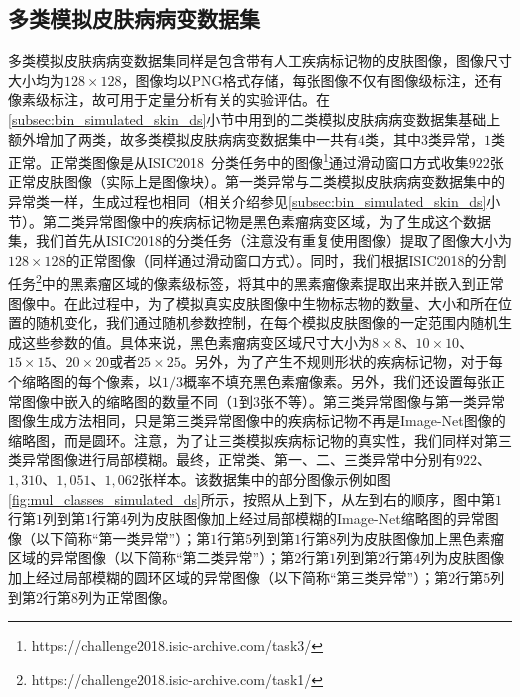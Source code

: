\subsection{多类模拟皮肤病病变数据集}
多类模拟皮肤病病变数据集同样是包含带有人工疾病标记物的皮肤图像，图像尺寸大小均为$128\times 128$，图像均以PNG格式存储，每张图像不仅有图像级标注，还有像素级标注，故可用于定量分析有关的实验评估。在\ref{subsec:bin_simulated_skin_ds}小节中用到的二类模拟皮肤病病变数据集基础上额外增加了两类，故多类模拟皮肤病病变数据集中一共有$4$类，其中$3$类异常，$1$类正常。正常类图像是从ISIC2018~\cite{codella2019skin, tschandl2018ham10000}分类任务中的图像\footnote{https://challenge2018.isic-archive.com/task3/}通过滑动窗口方式收集$922$张正常皮肤图像（实际上是图像块）。第一类异常与二类模拟皮肤病病变数据集中的异常类一样，生成过程也相同（相关介绍参见\ref{subsec:bin_simulated_skin_ds}小节）。第二类异常图像中的疾病标记物是黑色素瘤病变区域，为了生成这个数据集，我们首先从ISIC2018的分类任务（注意没有重复使用图像）提取了图像大小为$128\times 128$的正常图像（同样通过滑动窗口方式）。同时，我们根据ISIC2018的分割任务\footnote{https://challenge2018.isic-archive.com/task1/}中的黑素瘤区域的像素级标签，将其中的黑素瘤像素提取出来并嵌入到正常图像中。在此过程中，为了模拟真实皮肤图像中生物标志物的数量、大小和所在位置的随机变化，我们通过随机参数控制，在每个模拟皮肤图像的一定范围内随机生成这些参数的值。具体来说，黑色素瘤病变区域尺寸大小为$8\times 8$、$10\times 10$、$15\times 15$、$20\times 20$或者$25\times 25$。另外，为了产生不规则形状的疾病标记物，对于每个缩略图的每个像素，以$1/3$概率不填充黑色素瘤像素。另外，我们还设置每张正常图像中嵌入的缩略图的数量不同（$1$到$3$张不等）。第三类异常图像与第一类异常图像生成方法相同，只是第三类异常图像中的疾病标记物不再是Image-Net图像的缩略图，而是圆环。注意，为了让三类模拟疾病标记物的真实性，我们同样对第三类异常图像进行局部模糊。最终，正常类、第一、二、三类异常中分别有$922$、$1,310$、$1,051$、$1,062$张样本。该数据集中的部分图像示例如图\ref{fig:mul_classes_simulated_ds}所示，按照从上到下，从左到右的顺序，图中第$1$行第$1$列到第$1$行第$4$列为皮肤图像加上经过局部模糊的Image-Net缩略图的异常图像（以下简称“第一类异常”）；第$1$行第$5$列到第$1$行第$8$列为皮肤图像加上黑色素瘤区域的异常图像（以下简称“第二类异常”）；第$2$行第$1$列到第$2$行第$4$列为皮肤图像加上经过局部模糊的圆环区域的异常图像（以下简称“第三类异常”）；第$2$行第$5$列到第$2$行第$8$列为正常图像。
